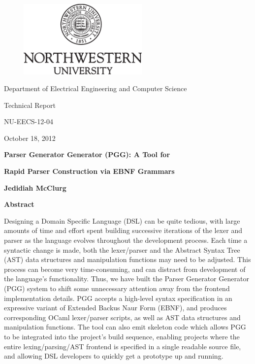 \documentclass{article}
\begin{document}
\vspace{-3.0in}
\begin{figure}
\centering
\includegraphics[width=2.5in]{nwu}
\end{figure}

%
\centerline{\Large Department of Electrical Engineering and Computer Science}
\vspace{0.2in}

\centerline{\Large { Technical Report}}
\vspace{0.05in}
\centerline{\Large { NU-EECS-12-04}}
\vspace{0.05in}
\centerline{\Large { October 18, 2012}}
\vspace{0.3in}

\centerline{\Large {\bf Parser Generator Generator (PGG): A Tool for}}
\centerline{\Large {\bf Rapid Parser Construction via EBNF Grammars}}
\vspace{0.3in}
\centerline{\large {\bf Jedidiah McClurg}}
\vspace{0.8in}

\centerline{\large {\bf Abstract}}
\vspace{0.15in}
Designing a Domain Specific Language (DSL) can be quite tedious,
with large amounts of time and effort spent building successive
iterations of the lexer and parser as the language evolves
throughout the development process.
Each time a syntactic change is made, both the lexer/parser and
the Abstract Syntax Tree (AST) data structures and manipulation
functions may need to be adjusted.  This process can become very
time-consuming, and can distract from development of the
language's functionality.  Thus, we have built the Parser
Generator Generator (PGG) system to shift some unnecessary
attention away from the frontend implementation details.  PGG accepts a high-level
syntax specification in an expressive variant of Extended Backus Naur Form (EBNF),
and produces corresponding OCaml lexer/parser scripts, as
well as AST data structures and manipulation functions.  The
tool can also emit skeleton code which allows
PGG to be integrated into the project's build sequence,  
enabling projects where the entire lexing/parsing/AST
frontend is specified in a single readable source file,
and allowing DSL developers to quickly get a prototype up and running.
\end{document}
